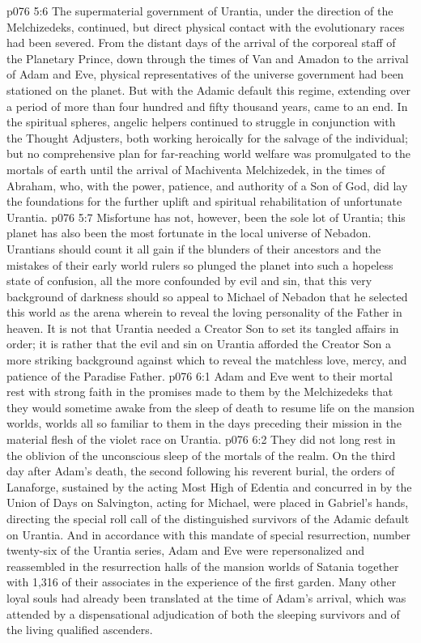 \pc \vs p076 5:6 The supermaterial government of Urantia, under the direction of the Melchizedeks, continued, but direct physical contact with the evolutionary races had been severed. From the distant days of the arrival of the corporeal staff of the Planetary Prince, down through the times of Van and Amadon to the arrival of Adam and Eve, physical representatives of the universe government had been stationed on the planet. But with the Adamic default this regime, extending over a period of more than four hundred and fifty thousand years, came to an end. In the spiritual spheres, angelic helpers continued to struggle in conjunction with the Thought Adjusters, both working heroically for the salvage of the individual; but no comprehensive plan for far\hyp{}reaching world welfare was promulgated to the mortals of earth until the arrival of Machiventa Melchizedek, in the times of Abraham, who, with the power, patience, and authority of a Son of God, did lay the foundations for the further uplift and spiritual rehabilitation of unfortunate Urantia.
\vs p076 5:7 Misfortune has not, however, been the sole lot of Urantia; this planet has also been the most fortunate in the local universe of Nebadon. Urantians should count it all gain if the blunders of their ancestors and the mistakes of their early world rulers so plunged the planet into such a hopeless state of confusion, all the more confounded by evil and sin, that this very background of darkness should so appeal to Michael of Nebadon that he selected this world as the arena wherein to reveal the loving personality of the Father in heaven. It is not that Urantia needed a Creator Son to set its tangled affairs in order; it is rather that the evil and sin on Urantia afforded the Creator Son a more striking background against which to reveal the matchless love, mercy, and patience of the Paradise Father.
\vs p076 6:1 Adam and Eve went to their mortal rest with strong faith in the promises made to them by the Melchizedeks that they would sometime awake from the sleep of death to resume life on the mansion worlds, worlds all so familiar to them in the days preceding their mission in the material flesh of the violet race on Urantia.
\vs p076 6:2 They did not long rest in the oblivion of the unconscious sleep of the mortals of the realm. On the third day after Adam’s death, the second following his reverent burial, the orders of Lanaforge, sustained by the acting Most High of Edentia and concurred in by the Union of Days on Salvington, acting for Michael, were placed in Gabriel’s hands, directing the special roll call of the distinguished survivors of the Adamic default on Urantia. And in accordance with this mandate of special resurrection, number twenty\hyp{}six of the Urantia series, Adam and Eve were repersonalized and reassembled in the resurrection halls of the mansion worlds of Satania together with 1,316 of their associates in the experience of the first garden. Many other loyal souls had already been translated at the time of Adam’s arrival, which was attended by a dispensational adjudication of both the sleeping survivors and of the living qualified ascenders.
